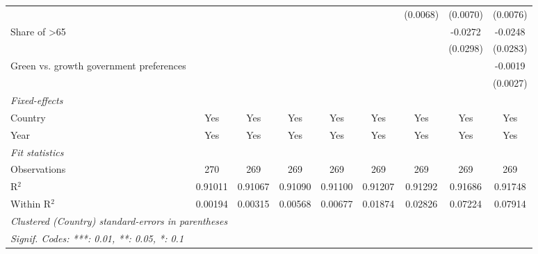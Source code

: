 \begin{table}[htbp]
\begin{tabular}{lcccccccc}
                                                              &          &          &          &          &          & (0.0068) & (0.0070) & (0.0076)\\   
      Share of >65                                            &          &          &          &          &          &          & -0.0272  & -0.0248\\   
                                                              &          &          &          &          &          &          & (0.0298) & (0.0283)\\   
      Green vs. growth government preferences                 &          &          &          &          &          &          &          & -0.0019\\   
                                                              &          &          &          &          &          &          &          & (0.0027)\\   
      \midrule
      \emph{Fixed-effects}\\
      Country                                                 & Yes      & Yes      & Yes      & Yes      & Yes      & Yes      & Yes      & Yes\\  
      Year                                                    & Yes      & Yes      & Yes      & Yes      & Yes      & Yes      & Yes      & Yes\\  
      \midrule
      \emph{Fit statistics}\\
      Observations                                            & 270      & 269      & 269      & 269      & 269      & 269      & 269      & 269\\  
      R$^2$                                                   & 0.91011  & 0.91067  & 0.91090  & 0.91100  & 0.91207  & 0.91292  & 0.91686  & 0.91748\\  
      Within R$^2$                                            & 0.00194  & 0.00315  & 0.00568  & 0.00677  & 0.01874  & 0.02826  & 0.07224  & 0.07914\\  
      \midrule \midrule
      \multicolumn{9}{l}{\emph{Clustered (Country) standard-errors in parentheses}}\\
      \multicolumn{9}{l}{\emph{Signif. Codes: ***: 0.01, **: 0.05, *: 0.1}}\\
   \end{tabular}
\end{table}


